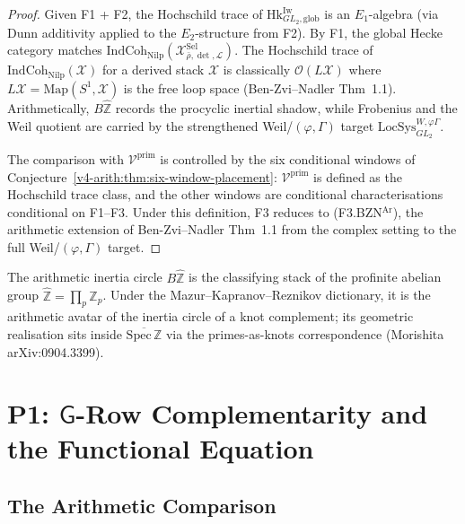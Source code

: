 \begin{proof}
Given F1 + F2, the Hochschild trace of
\(\mathrm{Hk}^{\mathrm{Iw}}_{GL_{2},\mathrm{glob}}\) is an
\(E_{1}\)-algebra (via Dunn additivity applied to the \(E_{2}\)-structure
from F2). By F1, the global Hecke category matches
\(\mathrm{IndCoh}_{\mathrm{Nilp}}(\mathcal{X}^{\mathrm{Sel}}_{\bar\rho,\det,\mathcal{L}})\).
The Hochschild trace of
\(\mathrm{IndCoh}_{\mathrm{Nilp}}(\mathcal{X})\) for a derived stack
\(\mathcal{X}\) is classically \(\mathcal{O}(L\mathcal{X})\) where
\(L\mathcal{X}=\mathrm{Map}(S^{1},\mathcal{X})\) is the free loop
space (Ben-Zvi--Nadler Thm~1.1). Arithmetically,
\(B\widehat{\mathbb{Z}}\) records the procyclic inertial shadow, while
Frobenius and the Weil quotient are carried by the strengthened
Weil/\((\varphi,\Gamma)\) target
\(\mathrm{LocSys}^{W,\varphi\Gamma}_{GL_{2}}\).

The comparison with \(\mathcal{V}^{\mathrm{prim}}\) is controlled by
the six conditional windows of
Conjecture~\ref{v4-arith:thm:six-window-placement}: \(\mathcal{V}^{\mathrm{prim}}\)
is defined as the Hochschild trace class, and the other windows are
conditional characterisations conditional on F1--F3. Under this definition,
F3 reduces to (F3.BZN\(^{\mathrm{Ar}}\)), the arithmetic extension of
Ben-Zvi--Nadler Thm~1.1 from the complex setting to the full
Weil/\((\varphi,\Gamma)\) target.
\end{proof}

\begin{remark}
\label{v4-arith:cl:rem:F3-inertia}
The arithmetic inertia circle \(B\widehat{\mathbb{Z}}\) is the
classifying stack of the profinite abelian group
\(\widehat{\mathbb{Z}}=\prod_{p}\mathbb{Z}_{p}\). Under the
Mazur--Kapranov--Reznikov dictionary, it is the arithmetic
avatar of the inertia circle of a knot complement; its geometric
realisation sits inside \(\overline{\mathrm{Spec}\,\mathbb{Z}}\)
via the primes-as-knots correspondence (Morishita
arXiv:0904.3399).
\end{remark}

\section{P1: \texorpdfstring{\(\mathsf{G}\)}{G}-Row Complementarity and the Functional Equation}
\label{v4-arith:cl:P1-resolution}

\subsection{The Arithmetic Comparison}

